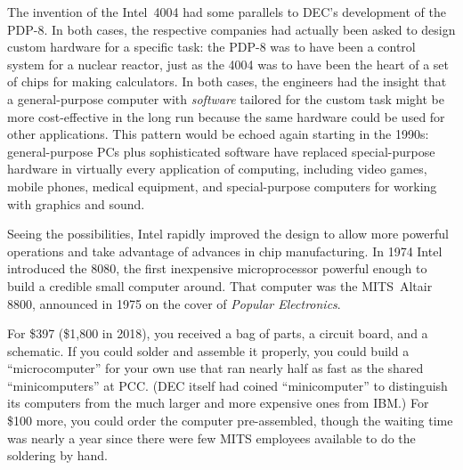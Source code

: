 \begin{tangent}
  The invention of the Intel~4004 had some parallels to
  DEC's development of the PDP-8.  In both cases, the respective
  companies had actually been asked to design custom hardware for a
  specific task: the PDP-8 was to have been a control
  system for a nuclear reactor, just as the 4004 was to have been the
  heart of a set of chips for making
  calculators.  In both cases, the engineers had the insight that a
  general-purpose computer with \emph{software} tailored for the
  custom task might be more cost-effective in the long run because the
  same hardware could be used for other applications.  This pattern
  would be echoed again starting in the 1990s: general-purpose PCs
  plus sophisticated software have replaced special-purpose hardware
  in virtually every application of computing, including video games, mobile
  phones, medical equipment, and special-purpose computers for working
  with graphics and sound.
\end{tangent}

Seeing the possibilities, Intel rapidly improved the design to allow
more powerful operations and take advantage of advances in chip
manufacturing.
In 1974 Intel introduced the 8080, the first inexpensive
microprocessor powerful enough to build a credible small computer
around.
That computer was the MITS~Altair 8800, announced in 1975 on the
cover of \emph{Popular Electronics}.


For \$397 (\$1,800 in 2018), you received a bag of parts, a
circuit board, and a schematic.  If you could solder and assemble it properly, you 
could build a ``microcomputer'' for your own use that ran nearly half as fast as the shared
``minicomputers'' at PCC.  (DEC itself had coined
``minicomputer'' to distinguish its computers from the much
larger and more expensive ones from IBM.)
For \$100 more, you could
order the computer pre-assembled, though the waiting time was nearly a year since
there were few MITS employees available to do the soldering by hand.

